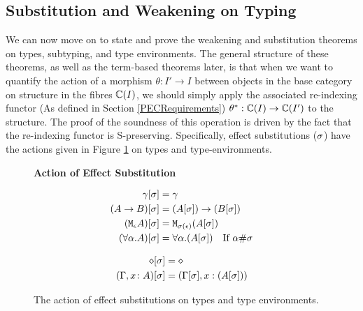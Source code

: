 \documentclass{Report}
\begin{document}
\subsection{Substitution and Weakening on Typing}
We can now move on to state and prove the weakening and substitution theorems on types, subtyping, and type environments. The general structure of these theorems, as well as the term-based theorems later, is that when we want to quantify the action of a morphism $\theta: I' \rightarrow I$ between objects in the base category on structure in the fibres $\mathbb{C}(I)$, we should simply apply the associated re-indexing functor (As defined in Section \ref{PECRequirements}) $\theta^*: \mathbb{C}(I) \rightarrow \mathbb{C}(I')$ to the structure. The proof of the soundness of this operation is driven by the fact that the re-indexing functor is S-preserving. Specifically, effect substitutions ($\sigma$) have the actions given in Figure \ref{SubstitutionActionTypesTypeEnvs} on types and type-environments.

\begin{figure}[H]
    
    \begin{framed}
        \centering
        \textbf{Action of Effect Substitution}

        \begin{minipage}{.47\linewidth}
            
\begin{align*}
    \gamma[\sigma] &= \gamma \\
    (A\rightarrow B)[\sigma] &= (A[\sigma])\rightarrow (B[\sigma]) \\
    (\texttt{M}_{\epsilon}{A})[\sigma] &= \texttt{M}_{\sigma(\epsilon)}{(A[\sigma])}\\
    (\forall \alpha. A)[\sigma] &= \forall \alpha. (A[\sigma])\quad\text{If $\alpha\#\sigma$}
\end{align*}
        \end{minipage}
        \quad
        \begin{minipage}{.47\linewidth}
            \begin{align*}
                \diamond[\sigma] & = \diamond \\
                (\Gamma, x\colon A)[\sigma] &= (\Gamma[\sigma], x:(A[\sigma]))\\
            \end{align*}            
        \end{minipage}
    \end{framed}
    
    \caption{The action of effect substitutions on types and type environments.}
    \label{SubstitutionActionTypesTypeEnvs}
\end{figure}
\end{document}
